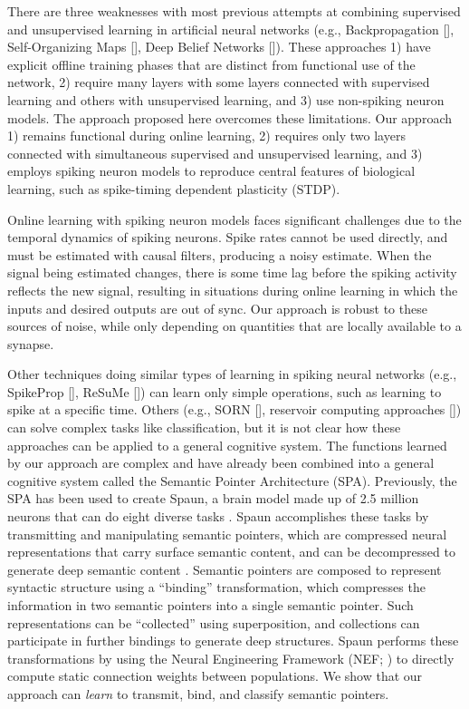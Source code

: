 \documentclass[10pt,letterpaper]{article}
\begin{document}
There are three weaknesses with most
previous attempts at combining
supervised and unsupervised learning
in artificial neural networks
(e.g., Backpropagation [],
Self-Organizing Maps [],
Deep Belief Networks []).
These approaches
1) have explicit offline training phases that are
distinct from functional use of the network,
2) require many layers with some layers
connected with supervised learning and others
with unsupervised learning, and
3) use non-spiking neuron models.
The approach proposed here overcomes these limitations.
Our approach 1) remains functional during online learning,
2) requires only two layers connected with
simultaneous supervised and unsupervised learning,
and 3) employs spiking neuron models
to reproduce central features of biological learning,
such as spike-timing dependent plasticity (STDP).

Online learning with spiking neuron models
faces significant challenges
due to the temporal dynamics of spiking neurons.
Spike rates cannot be used directly,
and must be estimated with causal filters,
producing a noisy estimate.
When the signal being estimated changes,
there is some time lag before the spiking activity
reflects the new signal,
resulting in situations during online learning
in which the inputs and desired outputs
are out of sync.
Our approach is robust to these sources of noise,
while only depending on quantities that
are locally available to a synapse.

Other techniques doing similar types of learning
in spiking neural networks
(e.g., SpikeProp [], ReSuMe [])
can learn only simple operations,
such as learning to spike at a specific time.
Others (e.g., SORN [], reservoir computing approaches
[]) can solve complex tasks like classification,
but it is not clear how these approaches can be applied
to a general cognitive system.
The functions learned by our approach are
complex and have already been combined into
a general cognitive system called the
Semantic Pointer Architecture (SPA).
Previously, the SPA has been used to create Spaun,
a brain model made up of 2.5 million neurons
that can do eight diverse tasks \cite{Eliasmith2012}.
Spaun accomplishes these tasks by
transmitting and manipulating semantic pointers,
which are compressed neural representations
that carry surface semantic content,
and can be decompressed to generate
deep semantic content \cite{EliasmithInPress}.
Semantic pointers are composed to represent syntactic structure
using a ``binding'' transformation,
which compresses the information in two semantic pointers
into a single semantic pointer.
Such representations can be ``collected''
using superposition, and collections
can participate in further bindings to generate deep structures.
Spaun performs these transformations by using
the Neural Engineering Framework (NEF; )
to directly compute static connection weights between populations.
We show that our approach can \textit{learn} to transmit, bind,
and classify semantic pointers.
\end{document}
